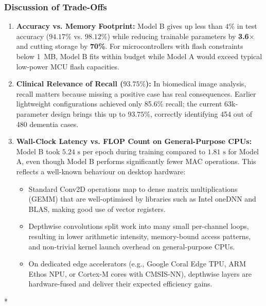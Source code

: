 \documentclass[11pt]{article}
\begin{document}
	\subsubsection{Discussion of Trade-Offs}
	\begin{enumerate}
		\item \textbf{Accuracy vs. Memory Footprint:}
		Model B gives up less than $4\%$ in test accuracy ($94.17\%$ vs. $98.12\%$) while reducing trainable parameters by \textbf{3.6$\times$} and cutting storage by \textbf{70\%}. For microcontrollers with flash constraints below 1~MB, Model B fits within budget while Model A would exceed typical low-power MCU flash capacities.
		
		\item \textbf{Clinical Relevance of Recall ($93.75\%$):}
		In biomedical image analysis, recall matters because missing a positive case has real consequences. Earlier lightweight configurations achieved only 85.6\% recall; the current 63k-parameter design brings this up to $93.75\%$, correctly identifying 454 out of 480 dementia cases.
		
		\item \textbf{Wall-Clock Latency vs. FLOP Count on General-Purpose CPUs:}
		Model B took $5.24\text{ s}$ per epoch during training compared to $1.81\text{ s}$ for Model A, even though Model B performs significantly fewer MAC operations. This reflects a well-known behaviour on desktop hardware:
		\begin{itemize}
			\item Standard Conv2D operations map to dense matrix multiplications (GEMM) that are well-optimised by libraries such as Intel oneDNN and BLAS, making good use of vector registers.
			\item Depthwise convolutions split work into many small per-channel loops, resulting in lower arithmetic intensity, memory-bound access patterns, and non-trivial kernel launch overhead on general-purpose CPUs.
			\item On dedicated edge accelerators (e.g., Google Coral Edge TPU, ARM Ethos NPU, or Cortex-M cores with CMSIS-NN), depthwise layers are hardware-fused and deliver their expected efficiency gains.
		\end{itemize}
	\end{enumerate}


	\begin{center}
		\vspace{1.5em}
		* \quad * \quad *
	\end{center}
\end{document}
